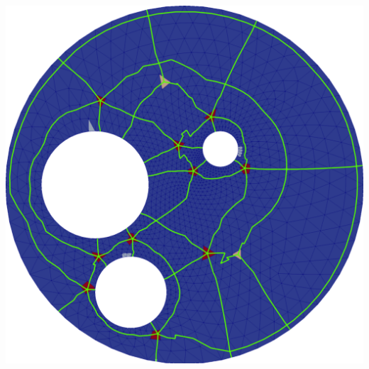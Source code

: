 \documentclass[a0paper,portrait, fontscale=0.30]{baposter}
\begin{document}
\begin{poster}
{\begin{center}
\begin{minipage}[b]{0.79\linewidth}
\includegraphics[width=1.0\textwidth]{CWCH_coarse-shortest_paths}%
\end{minipage}
\vspace{-0.2cm}
\end{center}
}
\end{poster}
\end{document}
